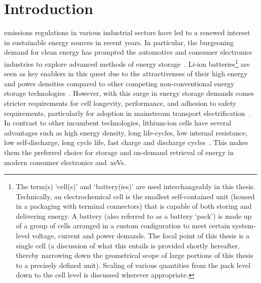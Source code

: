 
\graphicspath{{chapters/introduction/figures/}}
\chapter{Introduction}\label{ch:intro}


 emissions  regulations in various  industrial sectors
have led  to a renewed interest  in sustainable energy sources  in recent years.
In  particular,  the  burgeoning  demand  for  clean  energy  has  prompted  the
automotive and  consumer electronics industries  to explore advanced  methods of
energy storage~\cite{Weiss2011}. Li-ion batteries\footnote{The term(s) `cell(s)'
and  `battery(ies)' are  used interchangeably  in this  thesis. Technically,  an
electrochemical cell is the smallest  self-contained unit (housed in a packaging
with terminal connectors) that is capable of both storing and delivering energy.
A battery (also referred to as a battery  `pack') is made up of a group of cells
arranged  in  a  custom  configuration to  meet  certain  system-level  voltage,
current and  power demands.  The focal  point of  this thesis  is a  single cell
(a  discussion of  what  this  entails is  provided  shortly hereafter,  thereby
narrowing  down the  geometrical scope  of large  portions of  this thesis  to a
precisely defined unit). Scaling of various  quantities from the pack level down
to  the  cell  level  is  discussed  wherever  appropriate.}  are  seen  as  key
enablers  in this  quest due  to  the attractiveness  of their  high energy  and
power  densities compared  to  other competing  non-conventional energy  storage
technologies~\cite{Ibrahim2008}.  However, with  this  surge  in energy  storage
demands  comes  stricter  requirements  for  cell  longevity,  performance,  and
adhesion  to  safety  requirements,  particularly  for  adoption  in  mainstream
transport  electrification~\cite{Andrea2010}.  In  contrast to  other  incumbent
technologies,  lithium-ion cells  have several  advantages such  as high  energy
density,  long life-cycles,  low internal  resistance, low  self-discharge, long
cycle life,  fast charge  and discharge  cycles~\cite{Reddy2011,Plett2015}. This
makes them the preferred choice for storage and on-demand retrieval of energy in
modern consumer electronics and~\glspl{xeV}.

